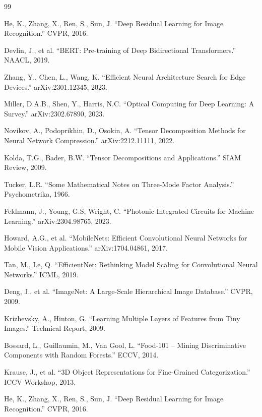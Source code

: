 \documentclass[10pt,twocolumn,letterpaper]{article}
\begin{document}

\begin{thebibliography}{99}

He, K., Zhang, X., Ren, S., Sun, J. ``Deep Residual Learning for Image Recognition.'' CVPR, 2016.

Devlin, J., et al. ``BERT: Pre-training of Deep Bidirectional Transformers.'' NAACL, 2019.

Zhang, Y., Chen, L., Wang, K. ``Efficient Neural Architecture Search for Edge Devices.'' arXiv:2301.12345, 2023.

Miller, D.A.B., Shen, Y., Harris, N.C. ``Optical Computing for Deep Learning: A Survey.'' arXiv:2302.67890, 2023.

Novikov, A., Podoprikhin, D., Osokin, A. ``Tensor Decomposition Methods for Neural Network Compression.'' arXiv:2212.11111, 2022.

Kolda, T.G., Bader, B.W. ``Tensor Decompositions and Applications.'' SIAM Review, 2009.

Tucker, L.R. ``Some Mathematical Notes on Three-Mode Factor Analysis.'' Psychometrika, 1966.

Feldmann, J., Young, G.S, Wright, C. ``Photonic Integrated Circuits for Machine Learning.'' arXiv:2304.98765, 2023.

Howard, A.G., et al. ``MobileNets: Efficient Convolutional Neural Networks for Mobile Vision Applications.'' arXiv:1704.04861, 2017.

Tan, M., Le, Q. ``EfficientNet: Rethinking Model Scaling for Convolutional Neural Networks.'' ICML, 2019.

Deng, J., et al. ``ImageNet: A Large-Scale Hierarchical Image Database.'' CVPR, 2009.

Krizhevsky, A., Hinton, G. ``Learning Multiple Layers of Features from Tiny Images.'' Technical Report, 2009.

Bossard, L., Guillaumin, M., Van Gool, L. ``Food-101 -- Mining Discriminative Components with Random Forests.'' ECCV, 2014.

Krause, J., et al. ``3D Object Representations for Fine-Grained Categorization.'' ICCV Workshop, 2013.

He, K., Zhang, X., Ren, S., Sun, J. ``Deep Residual Learning for Image Recognition.'' CVPR, 2016.


\end{thebibliography}
\end{document}
